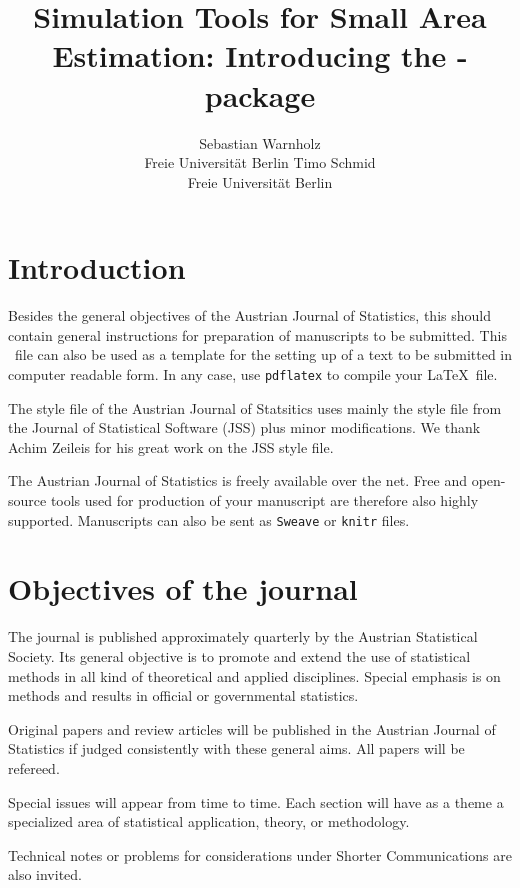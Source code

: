 \documentclass[article]{ajs}
\author{Sebastian Warnholz\\ Freie Universit\"at Berlin \And 
        Timo Schmid \\ Freie Universit\"at Berlin}
\title{Simulation Tools for Small Area Estimation: Introducing the \proglang{R}-package \proglang{saeSim}}
\begin{document}


\section{Introduction}

Besides the general objectives of the Austrian Journal of
Statistics, this should contain general instructions for
preparation of manuscripts to be submitted. This \LaTeXe\ file can
also be used as a template for the setting up of a text to be
submitted in computer readable form. In any case, use \texttt{pdflatex} to compile your \LaTeX \ file.

The style file of the Austrian Journal of Statsitics uses mainly the style file from the Journal of Statistical Software (JSS) plus minor modifications. We thank Achim Zeileis for his great work on the JSS style file.


The Austrian Journal of Statistics is freely available over the net. Free and open-source tools used for production of your manuscript are therefore also highly supported. Manuscripts can also be sent as \texttt{Sweave} \citep[see, e.g.,][]{leisch02} or \texttt{knitr} \citep{yihui13} files.



\section{Objectives of the journal}

The journal is published approximately quarterly by the Austrian
Statistical Society. Its general objective is to promote and
extend the use of statistical methods in all kind of theoretical
and applied disciplines. Special emphasis is on methods and
results in official or governmental statistics.

Original papers and review articles will be published in the
Austrian Journal of Statistics if judged consistently with these
general aims. All papers will be refereed.

Special issues will appear from time to time. Each
section will have as a theme a specialized area of statistical
application, theory, or methodology.

Technical notes or problems for considerations under Shorter
Communications are also invited.
\end{document}
